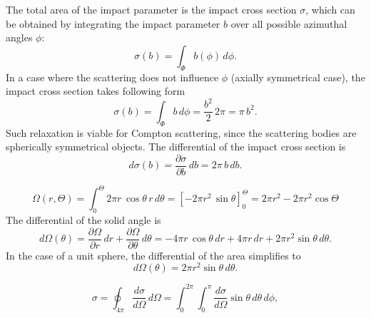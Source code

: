 \documentclass[a4paper,12pt,titlepage, twoside]{article}
\begin{document}
The total area of the impact parameter is the impact cross section $\sigma$, which can be obtained by integrating the impact parameter $b$ over all possible azimuthal angles $\phi$:
\begin{equation}
  \sigma\left(b\right) = \int_\Phi b\left(\phi\right)\,d\phi.
\end{equation}
In a case where the scattering does not influence $\phi$ (axially symmetrical case), the impact cross section takes following form
\begin{equation}
  \sigma\left(b\right) = \int_\Phi b\,d\phi = \frac{b^{2}}{2}\,2\pi = \pi\,b^2.
\end{equation}
Such relaxation is viable for Compton scattering, since the scattering bodies are spherically symmetrical objects.
The differential of the impact cross section is
\begin{equation}
  d\sigma\left(b\right) = \frac{\partial \sigma}{\partial b}\,db = 2\pi\,b\,db.
\end{equation}

\begin{equation}
  \Omega\left(r, \Theta\right) = \int_0^\Theta 2\pi r\,\cos\theta\,r\,d\theta = \left[-2\pi r^2\,\sin\theta\right]_0^\Theta = 2\pi r^2 - 2\pi r^2\cos\Theta
\end{equation}
The differential of the solid angle is
\begin{equation}
  d\Omega\left(\theta\right) = \frac{\partial \Omega}{\partial r}\,dr + \frac{\partial \Omega}{\partial \theta}\,d\theta = -4\pi r\,\cos\theta\,dr + 4\pi r\,dr + 2\pi r^2\sin\theta\,d\theta.
\end{equation}
In the case of a unit sphere, the differential of the area simplifies to
\begin{equation}
  d\Omega(\theta) = 2\pi r^2\sin\theta\,d\theta.
\end{equation}

\begin{equation}
  \sigma = \oint_{4\pi} \frac{d\sigma}{d\Omega}\,d\Omega = \int_0^{2\pi} \int_0^{\pi} \frac{d\sigma}{d\Omega}\sin\theta\,d\theta\,d\phi,
\end{equation}
\end{document}
